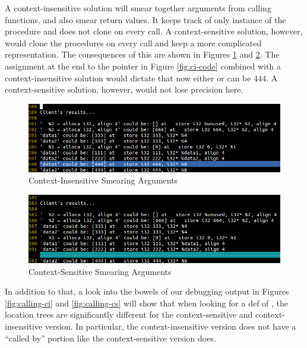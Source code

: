 A context-insensitive solution will smear together arguments from calling
functions, and also smear return values. It keeps track of only instance of the
procedure and does not clone on every call. A context-sensitive solution,
however, would clone the procedures on every call and keep a more complicated
representation. The consequences of this are shown in Figures \ref{fig:smear-ci}
and \ref{fig:smear-cs}. The assignment at the end to the pointer 
in Figure \ref{fig:ci-code} combined with a context-insensitive solution would
dictate that now either  or  can be $444$. A
context-sensitive solution, however, would not lose precision here.

\begin{figure}
\begin{center}
\leavevmode
\includegraphics[scale=0.5]{images/smear_ci.png}
\end{center}
\caption{Context-Insensitive Smearing Arguments}
\label{fig:smear-ci}
\end{figure}

\begin{figure}
\begin{center}
\leavevmode
\includegraphics[scale=0.5]{images/smear_cs.png}
\end{center}
\caption{Context-Sensitive Smearing Arguments}
\label{fig:smear-cs}
\end{figure}


In addition to that, a look into the bowels of our debugging output in Figures
\ref{fig:calling-ci} and \ref{fig:calling-cs} will show that when looking for a
def of , the location trees are significantly different for the
context-sensitive and context-insensitive version. In particular, the
context-insensitive version does not have a ``called by'' portion like the
context-sensitive version does.

